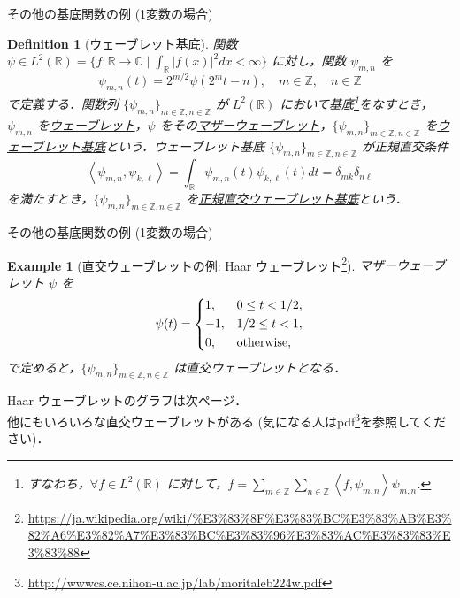 \documentclass[uplatex,11pt,dvipdfmx,aspectratio=169,unicode,t]{beamer}
\newtheorem{dfn}{Definition}
\newtheorem{ex}{Example}
\numberwithin{equation}{section}
\newcommand{\BC}{\mathbb{C}}
\newcommand{\BR}{\mathbb{R}}
\newcommand{\BZ}{\mathbb{Z}}
\newcommand{\ip}[1]{\left \langle #1 \right \rangle}
\newcommand{\1}{\bs{1}}
\newcommand{\0}{\bs{0}}
\begin{document}
\begin{frame}{その他の基底関数の例 (1変数の場合)}
    \begin{dfn}[ウェーブレット基底]
        関数 $\psi \in L^{2}(\BR) = \{f \colon \BR \rightarrow \BC \mid \int_{\BR} |f(x)|^{2} dx < \infty\}$ に対し，関数 $\psi_{m,n}$ を
        \begin{equation}
            \psi_{m,n}(t) = 2^{m/2} \psi(2^{m}t - n), \quad m \in \BZ, \quad n \in \BZ
        \end{equation}
        で定義する．関数列 $\{\psi_{m,n}\}_{m \in \BZ, n \in \BZ}$ が $L^{2}(\BR)$ において基底\footnote{すなわち，$\forall f \in L^{2}(\BR)$ に対して，$f = \sum_{m \in \BZ} \sum_{n \in \BZ} \ip{f,\psi_{m,n}} \psi_{m,n}$.}をなすとき，$\psi_{m,n}$ を\underline{ウェーブレット}，$\psi$ をその\underline{マザーウェーブレット}，$\{\psi_{m,n}\}_{m \in \BZ, n \in \BZ}$ を\underline{ウェーブレット基底}という．ウェーブレット基底 $\{\psi_{m,n}\}_{m \in \BZ, n \in \BZ}$ が正規直交条件
        \begin{equation}
            \ip{\psi_{m,n},\psi_{k,\ell}} = \int_{\BR} \psi_{m,n}(t) \overline{\psi_{k,\ell}(t)} dt = \delta_{mk}\delta_{n\ell}
        \end{equation}
        を満たすとき，$\{\psi_{m,n}\}_{m \in \BZ, n \in \BZ}$ を\underline{正規直交ウェーブレット基底}という．
    \end{dfn}
\end{frame}

\begin{frame}{その他の基底関数の例 (1変数の場合)}
    \begin{ex}[直交ウェーブレットの例: Haar ウェーブレット\footnote{\url{https://ja.wikipedia.org/wiki/\%E3\%83\%8F\%E3\%83\%BC\%E3\%83\%AB\%E3\%82\%A6\%E3\%82\%A7\%E3\%83\%BC\%E3\%83\%96\%E3\%83\%AC\%E3\%83\%83\%E3\%83\%88}}]
        マザーウェーブレット $\psi$ を
        \begin{equation}
            \psi(t) = \begin{dcases}
                1, & 0 \le t < 1/2, \\
                -1, & 1/2 \le t < 1, \\
                0, & \text{otherwise},
            \end{dcases}
        \end{equation}
        で定めると，$\{\psi_{m,n}\}_{m \in \BZ, n \in \BZ}$ は直交ウェーブレットとなる．
    \end{ex}
    Haar ウェーブレットのグラフは次ページ．\\
    他にもいろいろな直交ウェーブレットがある (気になる人はpdf\footnote{\url{http://wwwcs.ce.nihon-u.ac.jp/lab/moritaleb224w.pdf}}を参照してください)．
\end{frame}
\end{document}
